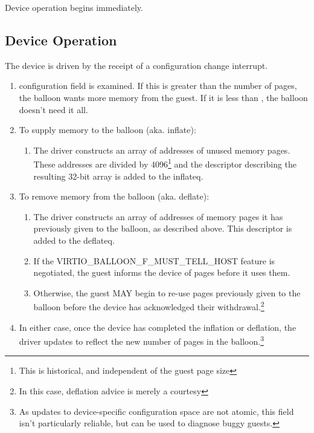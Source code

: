 Device operation begins immediately.

\subsection{Device Operation}\label{sec:Device Types / Memory Balloon Device / Device Operation}

The device is driven by the receipt of a
configuration change interrupt.

\begin{enumerate}
\item {} configuration field is examined. If this is
  greater than the  number of pages, the balloon wants
  more memory from the guest.  If it is less than ,
  the balloon doesn't need it all.

\item To supply memory to the balloon (aka. inflate):
  \begin{enumerate}
  \item The driver constructs an array of addresses of unused memory
    pages. These addresses are divided by 4096\footnote{This is historical, and independent of the guest page size
} and the descriptor
    describing the resulting 32-bit array is added to the inflateq.
  \end{enumerate}

\item To remove memory from the balloon (aka. deflate):
  \begin{enumerate}
  \item The driver constructs an array of addresses of memory pages
    it has previously given to the balloon, as described above.
    This descriptor is added to the deflateq.

  \item If the VIRTIO_BALLOON_F_MUST_TELL_HOST feature is negotiated, the
    guest informs the device of pages before it uses them.

  \item Otherwise, the guest MAY begin to re-use pages previously
    given to the balloon before the device has acknowledged their
    withdrawal.\footnote{In this case, deflation advice is merely a courtesy
}
  \end{enumerate}

\item In either case, once the device has completed the inflation or
  deflation, the driver updates  to reflect the new number of pages in the balloon.\footnote{As updates to device-specific configuration space are not atomic, this field
isn't particularly reliable, but can be used to diagnose buggy guests.
}
\end{enumerate}

